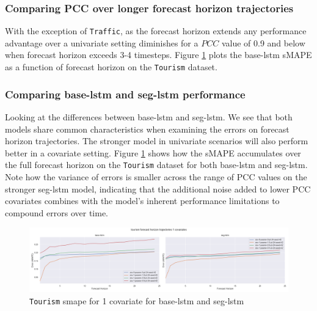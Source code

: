 \documentclass{article}
\newcommand{\pearson}{PCC}
\begin{document}
\subsubsection{Comparing PCC over longer forecast horizon trajectories}
With the exception of \texttt{Traffic}, as the forecast horizon extends any performance advantage over a univariate setting diminishes for 
a $\pearson$ value of 0.9 and below when forecast horizon exceeds 3-4 timesteps. Figure \ref{fig:tourism_base_vs_seg} plots the base-lstm sMAPE as 
a function of forecast horizon on the \texttt{Tourism} dataset.
\subsubsection{Comparing base-lstm and seg-lstm performance}
Looking at the differences between base-lstm and seg-lstm. We see that both models share common characteristics when examining the errors on forecast horizon trajectories. 
The stronger model in univariate scenarios will also perform better in a covariate setting. Figure \ref{fig:tourism_base_vs_seg} shows how the sMAPE accumulates over the full forecast horizon on 
the \texttt{Tourism} dataset for both base-lstm and seg-lstm. Note how the variance of errors is smaller across the range of PCC values on 
the stronger seg-lstm model, indicating that the additional noise added to lower PCC covariates combines with the model's inherent performance limitations to compound errors over time.
\begin{figure}[ht]
  \centering
  \includegraphics[width=1.\textwidth]{figures/models_tour_k1.png}
  \caption{\texttt{Tourism} smape for 1 covariate for base-lstm and seg-lstm}
  \label{fig:tourism_base_vs_seg}
  \end{figure}
\end{document}
